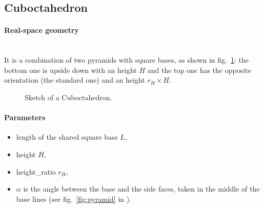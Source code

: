 \newpage
\subsection{Cuboctahedron} 

\paragraph{Real-space geometry}\strut\\
It is a combination of two pyramids with square bases, as shown in fig.~\ref{fig:cuboctahedron}: the bottom one
is upside down with an height $H$ and the top one has the opposite
orientation (the standard one) and an height $r_H \times H$.

\begin{figure}[ht]
\hfill
{}
\hfill
{}
\hfill
\caption{Sketch of a Cuboctahedron.}
\label{fig:cuboctahedron}
\end{figure}

\FloatBarrier

\paragraph{Parameters}
\begin{itemize}
\item length of the shared square base $L$,
\item height $H$,
\item height\_ratio $r_H$,
\item $\alpha$ is the angle between the base and the
  side faces, taken in the middle of the base lines (see
  fig.~\ref{fig:pyramid} in ).
\end{itemize}

